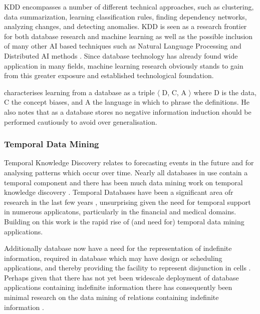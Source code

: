 KDD encompasses a number of different
technical approaches, such as clustering, data summarization, learning
classification rules, finding dependency networks, analyzing changes,
and detecting anomalies.  
KDD is seen as a research frontier for both database research and machine learning as well as the
possible inclusion of many other AI based techniques such as Natural Language 
Processing and Distributed AI methods \cite{kdd96}.  Since database technology has already found
wide application in many fields, machine learning research obviously
stands to gain from this greater exposure and established
technological foundation. 

\medskip

\cite{xiao95} characterises learning from a database as a triple
$\langle$ D, C, A $\rangle$ where
D is the data, C the concept biases, and A the language in which to phrase the definitions.
He also notes that as a database stores no negative information induction should be performed
cautiously to avoid over generalisation.

\subsubsection{Temporal Data Mining}

Temporal Knowledge Discovery relates to forecasting events in the future and for analysing
patterns which occur over time. Nearly all databases in use contain a
temporal component and there has been much data mining work on
temporal knowledge discovery \cite{alss95,pt96,bc96,bt98}. Temporal
Databases have been a significant area ofr research in the last few
years \cite{tcg93,ct95}, unsurprising given the need for temporal
support in numerous applicatons, particularly in the financial and
medical domains.  Building on this work is the rapid rise of (and need
for) temporal data mining applications.  

\medskip

Additionally database now have a need for the representation of
indefinite information, required in database which may have design or
scheduling applications, and thereby providing the facility to
represent disjunction in cells \cite{il84,inv91,ivv95,vn95}.  Perhaps
given that there has not yet been widescale deployment of database
applications containing indefinite information there has consequently
been minimal research on the data mining of relations containing
indefinite information \cite{cl98b}.

\medskip

